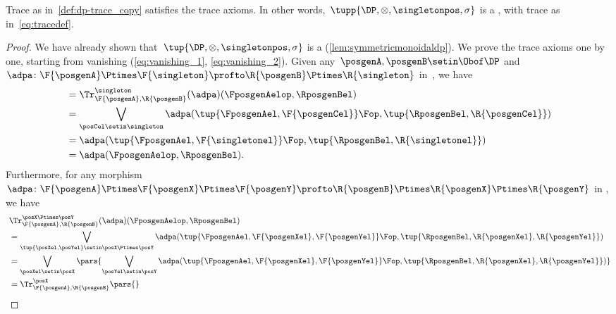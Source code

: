 {    \begin{lemma}\label{lem:dp-trace-is-trace_copy}
        Trace as in~\cref{def:dp-trace_copy} satisfies the trace axioms.
        In other words,~$\tupp{\DP, {{\otimes}}, \singletonpos, \sigma}$ is a , with trace as in~\cref{eq:tracedef}.
    \end{lemma}
    \begin{proof}
        We have already shown that~$\tup{\DP,{{\otimes}},\singletonpos,\sigma}$ is a  (\cref{lem:symmetricmonoidaldp}).
        We prove the trace axioms one by one, starting from vanishing (\cref{eq:vanishing_1}, \cref{eq:vanishing_2}).
        Given any~$\posgenA,\posgenB\setin \Obof\DP$ and~$\adpa\colon \F{\posgenA}\Ptimes \F{\singleton}\profto \R{\posgenB}\Ptimes \R{\singleton}$ in~\DP, we have
        \begin{equation}
            \begin{aligned}
                 & = \Tr_{\F{\posgenA},\R{\posgenB}}^{\singleton}(\adpa)(\FposgenAelop,\RposgenBel) \\
                 & =\bigvee_{\posCel\setin \singleton}\adpa(\tup{\FposgenAel,\F{\posgenCel}}\Fop, \tup{\RposgenBel,\R{\posgenCel}}) \\
                 & =\adpa(\tup{\FposgenAel,\F{\singletonel}}\Fop, \tup{\RposgenBel,\R{\singletonel}}) \\
                 & =\adpa(\FposgenAelop,\RposgenBel).
            \end{aligned}
        \end{equation}
        Furthermore, for any morphism~$\adpa\colon \F{\posgenA}\Ptimes \F{\posgenX}\Ptimes \F{\posgenY} \profto \R{\posgenB}\Ptimes \R{\posgenX} \Ptimes \R{\posgenY}$ in \DP, we have
        \begin{equation}
            \begin{aligned}
                ~ & \Tr_{\F{\posgenA},\R{\posgenB}}^{\posX\Ptimes\posY}(\adpa)(\FposgenAelop,\RposgenBel) \\
                  & = \bigvee_{\tup{\posXel,\posYel} \setin \posX\Ptimes \posY} \adpa(\tup{\FposgenAel,\F{\posgenXel},\F{\posgenYel}}\Fop, \tup{\RposgenBel,\R{\posgenXel},\R{\posgenYel}}) \\
                  & =\bigvee_{\posXel \setin \posX}\pars{\bigvee_{\posYel \setin \posY} \adpa(\tup{\FposgenAel,\F{\posgenXel},\F{\posgenYel}}\Fop, \tup{\RposgenBel,\R{\posgenXel},\R{\posgenYel}})} \\
                  & =\Tr_{\F{\posgenA},\R{\posgenB}}^\posX\pars{
}
\end{aligned}
\end{equation}
\end{proof}}
